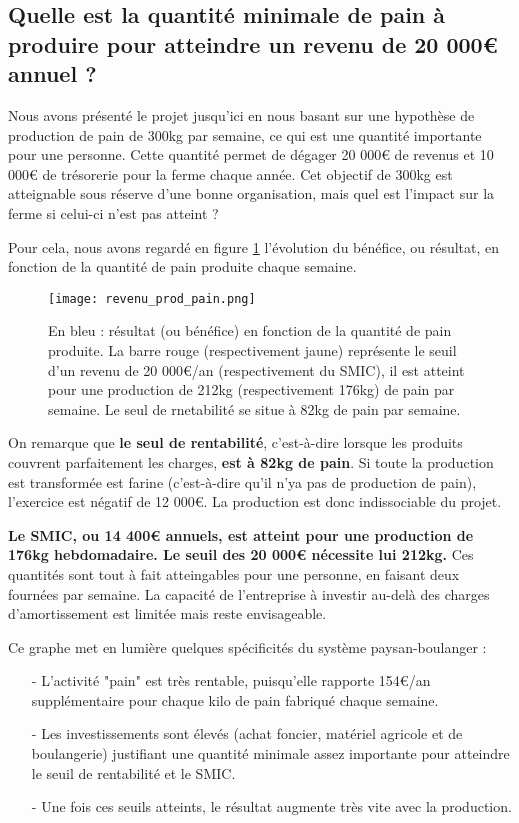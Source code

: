 \documentclass{book}
\begin{document}
\subsection{Quelle est la quantité minimale de pain à produire pour atteindre un revenu de 20 000\euro{} annuel ?}
\label{part:reduc_pain}

Nous avons présenté le projet jusqu'ici en nous basant sur une hypothèse de production de pain de 300kg par semaine, ce qui est une quantité importante pour une personne. Cette quantité permet de dégager 20 000\euro{} de revenus et 10 000\euro{} de trésorerie pour la ferme chaque année. Cet objectif de 300kg est atteignable sous réserve d'une bonne organisation, mais quel est l'impact sur la ferme si celui-ci n'est pas atteint ? 

Pour cela, nous avons regardé en figure \ref{fig:renta} l'évolution du bénéfice, ou résultat, en fonction de la quantité de pain produite chaque semaine.

\begin{figure}[h!]
\begin{center}
	\texttt{[image: revenu\_prod\_pain.png]}
	\caption{En bleu : résultat (ou bénéfice) en fonction de la quantité de pain produite. La barre rouge (respectivement jaune) représente le seuil d'un revenu de 20 000\euro{}/an (respectivement du SMIC), il est atteint pour une production de 212kg (respectivement 176kg) de pain par semaine. Le seul de rnetabilité se situe à 82kg de pain par semaine.}
	\label{fig:renta}
\end{center}
\end{figure}

On remarque que \textbf{le seul de rentabilité}, c'est-à-dire lorsque les produits couvrent parfaitement les charges, \textbf{est à 82kg de pain}. Si toute la production est transformée est farine (c'est-à-dire qu'il n'ya pas de production de pain), l'exercice est négatif de 12 000\euro{}. La production est donc indissociable du projet.

\textbf{Le SMIC, ou 14 400\euro{} annuels, est atteint pour une production de 176kg hebdomadaire. Le seuil des 20 000\euro{} nécessite lui 212kg.} Ces quantités sont tout à fait atteingables pour une personne, en faisant deux fournées par semaine. La capacité de l'entreprise à investir au-delà des charges d'amortissement est limitée mais reste envisageable.

Ce graphe met en lumière quelques spécificités du système paysan-boulanger :
\begin{itemize}

	\item[-] L'activité "pain" est très rentable, puisqu'elle rapporte 154\euro{}/an supplémentaire pour chaque kilo de pain fabriqué chaque semaine.
	\item[-] Les investissements sont élevés (achat foncier, matériel agricole et de boulangerie) justifiant une quantité minimale assez importante pour atteindre le seuil de rentabilité et le SMIC.
	\item[-] Une fois ces seuils atteints, le résultat augmente très vite avec la production.

\end{itemize}
\end{document}
